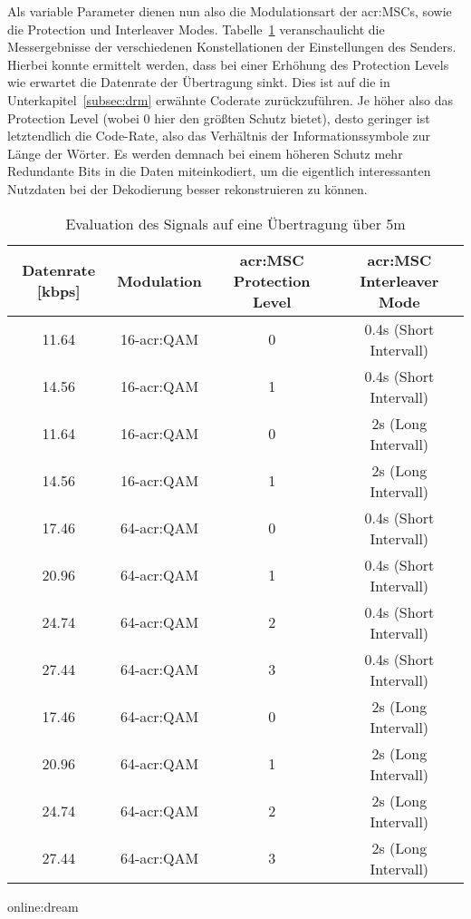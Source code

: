 Als variable Parameter dienen nun also die Modulationsart der \gls{acr:MSC}s, sowie die Protection und Interleaver Modes. Tabelle~\ref{tab:drmevaluationmax} veranschaulicht die Messergebnisse der verschiedenen Konstellationen der Einstellungen des Senders. Hierbei konnte ermittelt werden, dass bei einer Erhöhung des Protection Levels wie erwartet die Datenrate der Übertragung sinkt. Dies ist auf die in Unterkapitel~\ref{subsec:drm} erwähnte Coderate zurückzuführen. Je höher also das Protection Level (wobei 0 hier den größten Schutz bietet), desto geringer ist letztendlich die Code-Rate, also das Verhältnis der Informationssymbole zur Länge der Wörter. Es werden demnach bei einem höheren Schutz mehr Redundante Bits in die Daten miteinkodiert, um die eigentlich interessanten Nutzdaten bei der Dekodierung besser rekonstruieren zu können. 



\begin{table}[H]
	\begin{center}
		\begin{tabular}{cccc}
			\toprule
			\textbf{Datenrate [kbps]} & \textbf{Modulation}& \textbf{\gls{acr:MSC} Protection Level} & \textbf{\gls{acr:MSC} Interleaver Mode}\\
			\midrule
			11.64 & 16-\gls{acr:QAM} & 0 & 0.4s (Short Intervall)\\
			14.56 &16-\gls{acr:QAM} & 1 & 0.4s (Short Intervall)\\
			11.64 & 16-\gls{acr:QAM} & 0 & 2s (Long Intervall)\\
			14.56 & 16-\gls{acr:QAM} & 1 & 2s (Long Intervall) \\
			17.46 & 64-\gls{acr:QAM} & 0 & 0.4s (Short Intervall)\\
			20.96 & 64-\gls{acr:QAM} & 1 & 0.4s (Short Intervall)\\
			24.74 & 64-\gls{acr:QAM} & 2 & 0.4s (Short Intervall)\\
			27.44 & 64-\gls{acr:QAM} & 3 & 0.4s (Short Intervall) \\
			17.46 & 64-\gls{acr:QAM} & 0 & 2s (Long Intervall)\\
			20.96 & 64-\gls{acr:QAM} & 1 & 2s (Long Intervall)\\
			24.74 & 64-\gls{acr:QAM} & 2 & 2s (Long Intervall)\\
			27.44 & 64-\gls{acr:QAM} & 3 & 2s (Long Intervall) \\
			\bottomrule
		\end{tabular}
		\caption{Evaluation des Signals auf eine Übertragung über 5m}\gls{online:dream}
		\label{tab:drmevaluationmax}
	\end{center}
\end{table}





